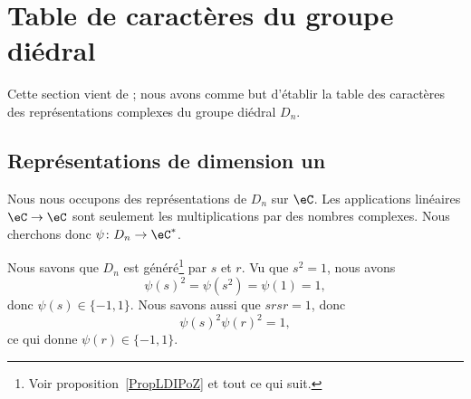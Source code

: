 \section{Table de caractères du groupe diédral}
\label{SecWMzheKf}
Cette section vient de \cite{KXjFWKA}; nous avons comme but d'établir la table des caractères des représentations complexes du groupe diédral \( D_n\).

\subsection{Représentations de dimension un}

Nous nous occupons des représentations de \( D_n\) sur \( \eC\). Les applications linéaires \( \eC\to \eC\) sont seulement les multiplications par des nombres complexes. Nous cherchons donc \( \psi\colon D_n\to \eC^*\).

Nous savons que \( D_n\) est généré\footnote{Voir proposition~\ref{PropLDIPoZ} et tout ce qui suit.} par \( s\) et \( r\). Vu que \( s^2=1\), nous avons
\begin{equation}
	\psi(s)^2=\psi(s^2)=\psi(1)=1,
\end{equation}
donc \( \psi(s)\in\{ -1,1 \}\). Nous savons aussi que \( srsr=1\), donc
\begin{equation}
	\psi(s)^2\psi(r)^2=1,
\end{equation}
ce qui donne \( \psi(r)\in\{ -1,1 \}\).


